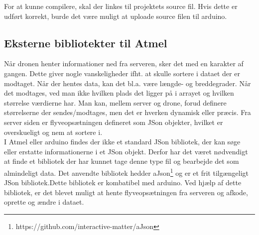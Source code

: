 For at kunne compilere, skal der linkes til projektets source fil. Hvis dette er udført korrekt, burde det være muligt at uploade source filen til arduino.

\subsection{Eksterne bibliotekter til Atmel}

Når dronen henter informationer ned fra serveren, sker det med en karakter af gangen. Dette giver nogle vanskeligheder ifht. at skulle sortere i dataet der er modtaget. Når der hentes data, kan det bl.a. være længde- og breddegrader. Når det modtages, ved man ikke hvilken plads det ligger på i arrayet og hvilken størrelse værdierne har. Man kan, mellem server og drone, forud definere størrelserne der sendes/modtages, men det er hverken dynamisk eller præcis. Fra server siden er flyveopsætningen defineret som JSon objekter, hvilket er overskueligt og nem at sortere i. \\
I Atmel eller arduino findes der ikke et standard JSon bibliotek, der kan søge eller erstatte informationerne i et JSon objekt. Derfor har det været nødvendigt at finde et bibliotek der har kunnet tage denne type fil og bearbejde det som almindeligt data. Det anvendte bibliotek hedder aJson\footnote{https://github.com/interactive-matter/aJson} og er et frit tilgængeligt JSon bibliotek.Dette bibliotek er kombatibel med arduino. Ved hjælp af dette bibliotek, er det blevet muligt at hente flyveopsætningen fra serveren og afkode, oprette og ændre i dataet.